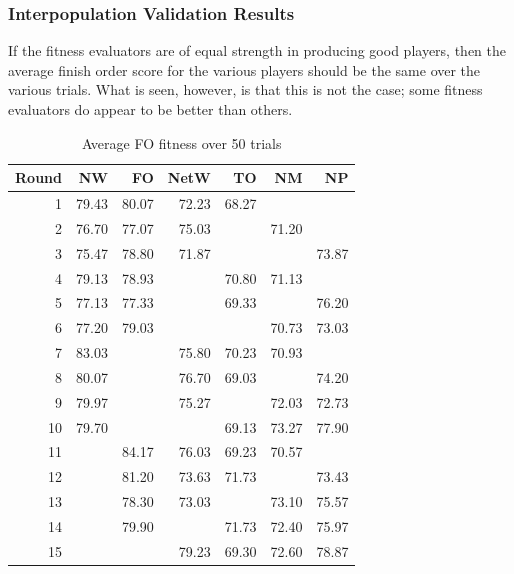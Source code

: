 \subsubsection{Interpopulation Validation Results}

If the fitness evaluators are of equal strength in producing good players, then
the average finish order score for the various players should be the same over
the various trials. What is seen, however, is that this is not the case; some
fitness evaluators do appear to be better than others.

\begin{table}[htbp]
  \centering
  \caption{Average FO fitness over 50 trials}
    \begin{tabular}{rrrrrrr}
    \toprule
    Round & NW    & FO    & NetW  & TO    & NM    & NP \\
    \midrule
    1     & 79.43 & 80.07 & 72.23 & 68.27 &       &       \\
    2     & 76.70 & 77.07 & 75.03 &       & 71.20 &       \\
    3     & 75.47 & 78.80 & 71.87 &       &       & 73.87 \\
    4     & 79.13 & 78.93 &       & 70.80 & 71.13 &       \\
    5     & 77.13 & 77.33 &       & 69.33 &       & 76.20 \\
    6     & 77.20 & 79.03 &       &       & 70.73 & 73.03 \\
    7     & 83.03 &       & 75.80 & 70.23 & 70.93 &       \\
    8     & 80.07 &       & 76.70 & 69.03 &       & 74.20 \\
    9     & 79.97 &       & 75.27 &       & 72.03 & 72.73 \\
    10    & 79.70 &       &       & 69.13 & 73.27 & 77.90 \\
    11    &       & 84.17 & 76.03 & 69.23 & 70.57 &       \\
    12    &       & 81.20 & 73.63 & 71.73 &       & 73.43 \\
    13    &       & 78.30 & 73.03 &       & 73.10 & 75.57 \\
    14    &       & 79.90 &       & 71.73 & 72.40 & 75.97 \\
    15    &       &       & 79.23 & 69.30 & 72.60 & 78.87 \\
    \bottomrule
    \end{tabular}%
  \label{tab:interpop_avgfitness}%
\end{table}%

